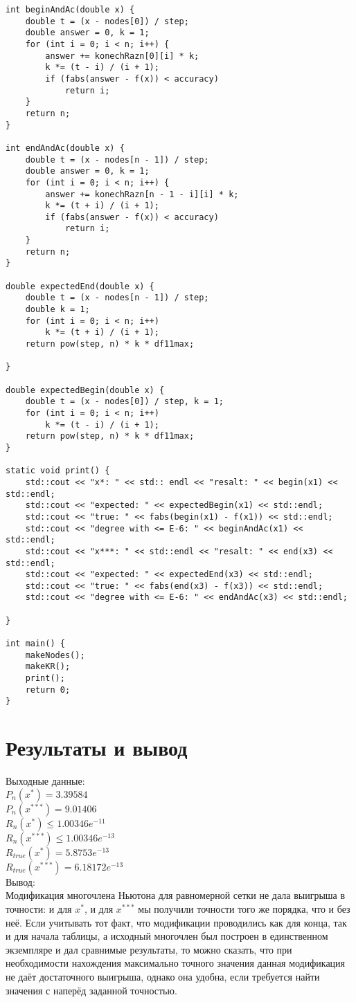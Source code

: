\documentclass[10pt]{scrartcl}
\begin{document}
\begin{verbatim}
int beginAndAc(double x) {
    double t = (x - nodes[0]) / step;
    double answer = 0, k = 1;
    for (int i = 0; i < n; i++) {
        answer += konechRazn[0][i] * k;
        k *= (t - i) / (i + 1);
        if (fabs(answer - f(x)) < accuracy)
            return i;
    }
    return n;
}

int endAndAc(double x) {
    double t = (x - nodes[n - 1]) / step;
    double answer = 0, k = 1;
    for (int i = 0; i < n; i++) {
        answer += konechRazn[n - 1 - i][i] * k;
        k *= (t + i) / (i + 1);
        if (fabs(answer - f(x)) < accuracy)
            return i;
    }
    return n;
}

double expectedEnd(double x) {
    double t = (x - nodes[n - 1]) / step;
    double k = 1;
    for (int i = 0; i < n; i++)
        k *= (t + i) / (i + 1);
    return pow(step, n) * k * df11max;

}

double expectedBegin(double x) {
    double t = (x - nodes[0]) / step, k = 1;
    for (int i = 0; i < n; i++)
        k *= (t - i) / (i + 1);
    return pow(step, n) * k * df11max;
}

static void print() {
    std::cout << "x*: " << std:: endl << "resalt: " << begin(x1) << std::endl;
    std::cout << "expected: " << expectedBegin(x1) << std::endl;
    std::cout << "true: " << fabs(begin(x1) - f(x1)) << std::endl;
    std::cout << "degree with <= E-6: " << beginAndAc(x1) << std::endl;
    std::cout << "x***: " << std::endl << "resalt: " << end(x3) << std::endl;
    std::cout << "expected: " << expectedEnd(x3) << std::endl;
    std::cout << "true: " << fabs(end(x3) - f(x3)) << std::endl;
    std::cout << "degree with <= E-6: " << endAndAc(x3) << std::endl;

}

int main() {
    makeNodes();
    makeKR();
    print();
    return 0;
}
\end{verbatim}
\section*{Результаты и вывод}\noindent
Выходные данные:\\
$P_n(x^*) = 3.39584$\\
$P_n(x^{***})= 9.01406$\\
$R_n(x^*) \leq 1.00346e^{-11}$\\
$R_n(x^{***}) \leq 1.00346e^{-13}$\\
$R_{true}(x^*) = 5.8753e^{-13}$\\
$R_{true}(x^{***}) = 6.18172e^{-13}$\\
Вывод:\\
Модификация многочлена Ньютона для равномерной сетки не дала выигрыша в точности: и для $x^*$, и для $x^{***}$ мы получили точности того же порядка, что и без неё. Если учитывать тот факт, что модификации проводились как для конца, так и для начала таблицы, а исходный многочлен был построен в единственном экземпляре и дал сравнимые результаты, то можно сказать, что при
необходимости нахождения максимально точного значения данная модификация не даёт достаточного выигрыша, однако она удобна, если требуется найти значения с наперёд заданной точностью.
\end{document}
